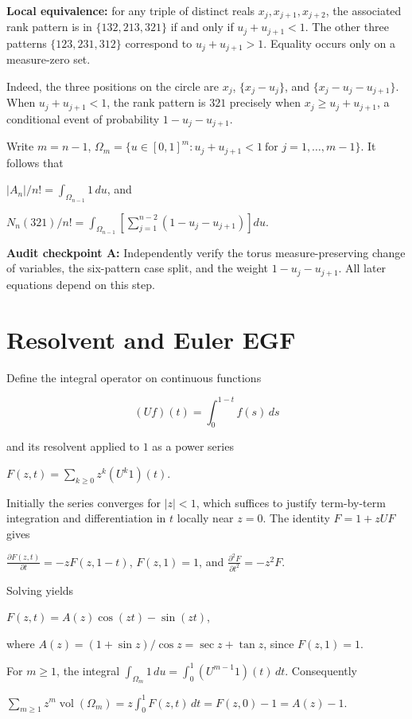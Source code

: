 \documentclass[
  11pt,
]{article}
\let\oldsection\section
\renewcommand{\section}{\needspace{5\baselineskip}\oldsection}
\begin{document}
\textbf{Local equivalence:} for any triple of distinct reals
\(x_j,x_{j+1},x_{j+2}\), the associated rank pattern is in
\(\{132,213,321\}\) if and only if \(u_j+u_{j+1}<1\). The other three
patterns \(\{123,231,312\}\) correspond to \(u_j+u_{j+1}>1\). Equality
occurs only on a measure-zero set.

Indeed, the three positions on the circle are \(x_j\), \(\{x_j-u_j\}\),
and \(\{x_j-u_j-u_{j+1}\}\). When \(u_j+u_{j+1}<1\), the rank pattern is
\(321\) precisely when \(x_j\geq u_j+u_{j+1}\), a conditional event of
probability \(1-u_j-u_{j+1}\).

Write \(m=n-1\),
\(\Omega_m=\{u\in[0,1]^m: u_j+u_{j+1}<1\ \text{for }j=1,\ldots,m-1\}\).
It follows that

\(|A_n|/n!=\int_{\Omega_{n-1}}1\,du\), and

\(N_n(321)/n!=\int_{\Omega_{n-1}}\left[\sum_{j=1}^{n-2}(1-u_j-u_{j+1})\right]du\).

\textbf{Audit checkpoint A:} Independently verify the torus
measure-preserving change of variables, the six-pattern case split, and
the weight \(1-u_j-u_{j+1}\). All later equations depend on this step.

\section{Resolvent and Euler EGF}\label{resolvent-and-euler-egf}

Define the integral operator on continuous functions

\[(Uf)(t)=\int_0^{1-t}f(s)\,ds\]

and its resolvent applied to \(1\) as a power series

\(F(z,t)=\sum_{k\geq0}z^k(U^k1)(t)\).

Initially the series converges for \(|z|<1\), which suffices to justify
term-by-term integration and differentiation in \(t\) locally near
\(z=0\). The identity \(F=1+zUF\) gives

\(\frac{\partial F(z,t)}{\partial t}=-zF(z,1-t)\), \(F(z,1)=1\), and
\(\frac{\partial^2F}{\partial t^2}=-z^2F\).

Solving yields

\(F(z,t)=A(z)\cos(zt)-\sin(zt)\),

where \(A(z)=(1+\sin z)/\cos z=\sec z+\tan z\), since \(F(z,1)=1\).

For \(m\geq1\), the integral
\(\int_{\Omega_m}1\,du=\int_0^1(U^{m-1}1)(t)\,dt\). Consequently

\(\sum_{m\geq1}z^m\operatorname{vol}(\Omega_m)=z\int_0^1F(z,t)\,dt=F(z,0)-1=A(z)-1\).
\end{document}
